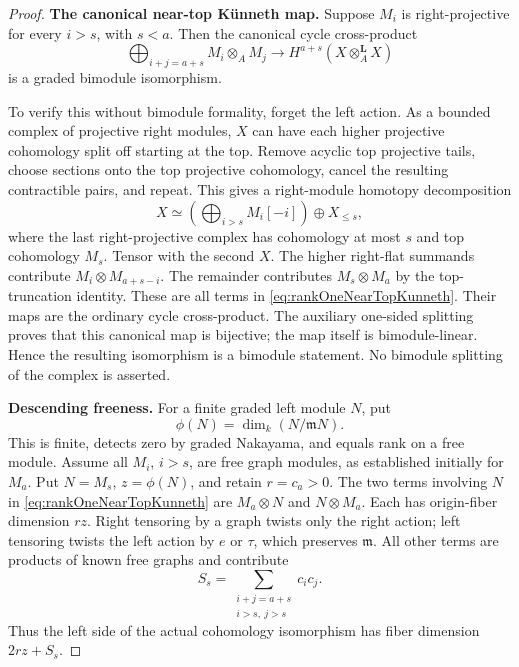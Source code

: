 \documentclass[11pt,a4paper]{article}
\theoremstyle{named}\newtheorem{finding}{Finding}[section]
\theoremstyle{definition}\newtheorem{definition}[finding]{Definition}
\theoremstyle{remark}\newtheorem{remark}[finding]{Remark}
\begin{document}
\begin{proof}
\par\smallskip\noindent\textbf{The canonical near-top K\"unneth map.}\quad
Suppose \(M_i\) is right-projective for every \(i>s\),
with \(s<a\). Then the canonical cycle cross-product
\begin{equation}\label{eq:rankOneNearTopKunneth}
 \bigoplus_{i+j=a+s}M_i\otimes_AM_j
       \longrightarrow H^{a+s}(X\otimes_A^{\mathbf L}X)
\end{equation}
is a graded bimodule isomorphism.

To verify this without bimodule formality, forget the
left action. As a bounded complex of projective right
modules, \(X\) can have each higher projective cohomology
split off starting at the top. Remove acyclic top
projective tails, choose sections onto the top projective
cohomology, cancel the resulting contractible pairs,
and repeat. This gives a right-module homotopy decomposition
\[
 X\simeq\left(\bigoplus_{i>s}M_i[-i]\right)\oplus X_{\le s},
\]
where the last right-projective complex has cohomology
at most \(s\) and top cohomology \(M_s\).
Tensor with the second \(X\). The higher right-flat
summands contribute \(M_i\otimes M_{a+s-i}\).
The remainder contributes \(M_s\otimes M_a\) by
the top-truncation identity. These are all terms
in \eqref{eq:rankOneNearTopKunneth}.
Their maps are the ordinary cycle cross-product.
The auxiliary one-sided splitting proves that this
canonical map is bijective; the map itself is
bimodule-linear. Hence the resulting isomorphism
is a bimodule statement. No bimodule splitting of
the complex is asserted.

\par\smallskip\noindent\textbf{Descending freeness.}\quad
For a finite graded left module \(N\), put
\[
 \phi(N)=\dim_k(N/\mathfrak mN).
\]
This is finite, detects zero by graded Nakayama,
and equals rank on a free module.
Assume all \(M_i\), \(i>s\), are free graph modules,
as established initially for \(M_a\).
Put \(N=M_s\), \(z=\phi(N)\), and retain \(r=c_a>0\).
The two terms involving \(N\) in
\eqref{eq:rankOneNearTopKunneth} are
\(M_a\otimes N\) and \(N\otimes M_a\).
Each has origin-fiber dimension \(rz\).
Right tensoring by a graph twists only the right
action; left tensoring twists the left action by
\(e\) or \(\tau\), which preserves \(\mathfrak m\).
All other terms are products of known free graphs
and contribute
\[
 S_s=\sum_{\substack{i+j=a+s\\i>s,\ j>s}}c_i c_j.
\]
Thus the left side of the actual cohomology
isomorphism has fiber dimension \(2rz+S_s\).


\end{proof}
\end{document}
